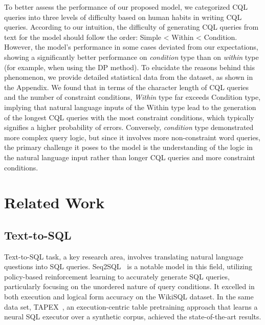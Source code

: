 \documentclass[11pt]{article}
\begin{document}
\begin{CJK*}{UTF8}{gbsn}
To better assess the performance of our proposed model, we categorized CQL queries into three levels of difficulty based on human habits in writing CQL queries. According to our intuition, the difficulty of generating CQL queries from text for the model should follow the order: Simple < Within < Condition. However, the model's performance in some cases deviated from our expectations, showing a significantly better performance on \emph{condition} type than on \emph{within} type (for example, when using the DP method). 
To elucidate the reasons behind this phenomenon, we provide detailed statistical data from the dataset, as shown in the Appendix.
We found that in terms of the character length of CQL queries and the number of constraint conditions, \emph{Within} type far exceeds Condition type, implying that natural language inputs of the Within type lead to the generation of the longest CQL queries with the most constraint conditions, which typically signifies a higher probability of errors. Conversely, \emph{condition} type demonstrated more complex query logic, but since it involves more non-constraint word queries, the primary challenge it poses to the model is the understanding of the logic in the natural language input rather than longer CQL queries and more constraint conditions.





\section{Related Work}
\label{sec:related_work}

\subsection{Text-to-SQL}
\label{sec:text2sql}

Text-to-SQL task, a key research area, involves translating natural language questions into SQL queries. 
Seq2SQL~\citep{zhong2017seq2sql} is a notable model in this field, utilizing policy-based reinforcement learning to accurately generate SQL queries, particularly focusing on the unordered nature of query conditions. 
It excelled in both execution and logical form accuracy on the WikiSQL dataset.
In the same data set, TAPEX~\citep{liu2022tapex}, an execution-centric table pretraining approach that learns a neural SQL executor over a synthetic corpus, achieved the state-of-the-art results.


\end{CJK*}
\end{document}
